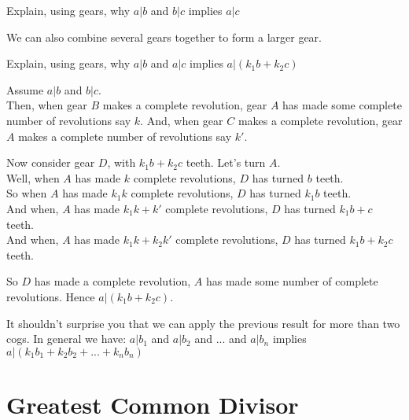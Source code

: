\begin{example}
Explain, using gears, why $a | b$ and $b | c$ implies $a | c$
\end{example}


\frmrule

We can also combine several gears together to form a larger gear. 

\frmrule

\begin{example}
Explain, using gears, why $a | b$ and $a | c$ implies $a | (k_1b + k_2c)$

Assume $a | b$ and $b | c$. \\
Then, when gear $B$ makes a complete revolution, gear $A$ has made some complete number of revolutions say $k$.
And, when gear $C$ makes a complete revolution, gear $A$ makes a complete number of revolutions say $k'$.

Now consider gear $D$, with $k_1b + k_2c$ teeth. Let's turn $A$. \\
Well, when $A$ has made $k$ complete revolutions, $D$ has turned $b$ teeth. \\
So when $A$ has made $k_1k$ complete revolutions, $D$ has turned $k_1b$ teeth.  \\
And when, $A$ has made $k_1k + k'$ complete revolutions, $D$ has turned $k_1b + c$ teeth. \\
And when, $A$ has made $k_1k + k_2k'$ complete revolutions, $D$ has turned $k_1b + k_2c$ teeth.

So $D$ has made a complete revolution, $A$ has made some number of complete revolutions. 
Hence $a | (k_1b + k_2c)$.
\end{example}

\frmrule

It shouldn't surprise you that we can apply the previous result for more than two cogs. 
In general we have: $a | b_1$ and $a | b_2$ and ... and  $a | b_n$ implies $a | (k_1b_1 + k_2b_2 + ... + k_nb_n)$





\section{Greatest Common Divisor}


\frmrule 

